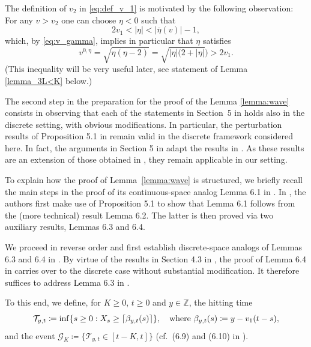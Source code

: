 \documentclass[12pt,reqno,oneside]{amsart}
\numberwithin{equation}{section}
\theoremstyle{definition}
\theoremstyle{remark}
\newcommand{\Z}{\mathbb{Z}}
\DeclarePairedDelimiter{\ceil}{\lceil}{\rceil}
\begin{document}
  The definition of $v_2$ in \eqref{eq:def_v_1} is motivated by the following observation: For any
  $v > v_2$ one can choose $\eta<0$ such that
  \begin{equation}
    \label{eq:vel_1}
    2v_1<|\eta|<|\overline{\eta}(v)|-1,
  \end{equation}
  which, by  \eqref{eq:v_gamma}, implies in particular that $\eta$ satisfies
  \begin{equation}\label{eq:v_0_eta}
    v^{0,\eta}=\sqrt{\eta(\eta-2)}=\sqrt{|\eta|(2+|\eta|})>2v_1.
\end{equation}
(This inequality will be very useful later, see statement of Lemma \ref{lemma_3L<K} below.)


The second step in the preparation for the proof of the Lemma
\ref{lemma:wave} consists in observing that each of the statements in
Section~5 in \cite{CDO25} holds also
in the discrete setting, with obvious modifications.
In particular, the perturbation results of Proposition 5.1 in \cite{CDO25} remain valid in the discrete framework considered here. In fact, the arguments in Section 5 in \cite{CDO25} adapt the results in \cite{DS22}.
As these results are an extension of those obtained in \cite{CD20}, they remain applicable in our setting.

To explain how the proof of Lemma~\ref{lemma:wave} is structured, we briefly
recall the main steps in the proof of its continuous-space analog Lemma 6.1
in \cite{CDO25}. In \cite{CDO25}, the authors first make use of Proposition
5.1 to show that Lemma 6.1 follows from the (more technical) result Lemma
6.2. The latter is then proved via two auxiliary results, Lemmas 6.3 and 6.4.

We proceed in reverse order and first establish discrete-space analogs of
Lemmas 6.3 and 6.4 in \cite{CDO25}. By virtue of the results in Section 4.3
in \cite{CD20}, the proof of Lemma 6.4 in \cite{CDO25} carries over to the
discrete case without substantial modification. It therefore suffices to
address Lemma 6.3 in \cite{CDO25}.

To this end, we define, for $K \geq0$, $t\geq 0$ and $y \in \Z$, the
hitting time
\begin{equation*}
  \mathcal{T}_{y,t}\coloneq\inf\{s\geq 0: X_s \geq \ceil{\beta_{y,t}(s)} \},
  \quad \text{where } \beta_{y,t}(s)\coloneq y-v_1(t-s),
\end{equation*}
and the event $\mathcal{G}_K\coloneq \{\mathcal{T}_{y,t} \in [t-K,t]\}$ (cf.~(6.9) and (6.10) in \cite{CDO25}).
\end{document}
